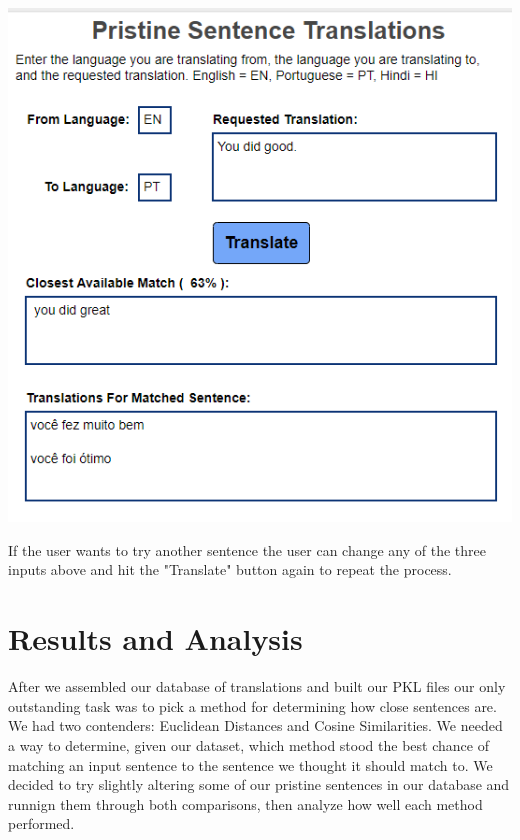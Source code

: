 \documentclass[runningheads]{llncs}
\begin{document}
	\begin{minipage}{\linewidth}
		\begin{center}
			\includegraphics[width=\linewidth]{Screen.png}
			\label{fig:Display Translations}
			\vspace*{1cm}
		\end{center}
	\end{minipage}
	\afterpage{\clearpage}
If the user wants to try another sentence the user can change any of the three inputs above and hit the "Translate" button again to repeat the process.

	\section{Results and Analysis}
	After we assembled our database of translations and built our PKL files our only outstanding task was to pick a method for determining how close sentences are. We had two contenders: Euclidean Distances and Cosine Similarities. We needed a way to determine, given our dataset, which method stood the best chance of matching an input sentence to the sentence we thought it should match to. We decided to try slightly altering some of our pristine sentences in our database and runnign them through both comparisons, then analyze how well each method performed.
\end{document}

